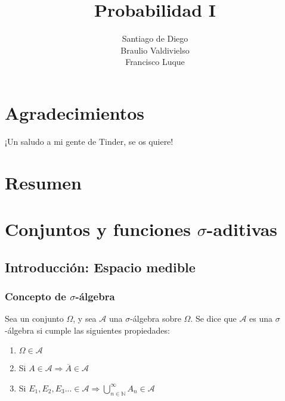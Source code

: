 \documentclass[12pt,a4paper]{book}
\author{Santiago de Diego\\Braulio Valdivielso\\Francisco Luque}
\title{Probabilidad I}
\date{}
\begin{document}
\maketitle
\newtheorem{theorem}{Teorema}[section]
\newtheorem{lemma}{Lema}[section]
\newtheorem{proof}{Demostración}[section]
\newpage
\chapter*{Agradecimientos} %
 
¡Un saludo a mi gente de Tinder, se os quiere!

\chapter*{Resumen} %

\tableofcontents
\chapter{Conjuntos y funciones $\sigma$-aditivas}

\section{Introducción: Espacio medible}

\subsection*{Concepto de $\sigma$-álgebra}
Sea un conjunto $\Omega$, y sea $\mathcal{A}$ una $\sigma$-álgebra sobre $\Omega$. Se dice que $\mathcal{A}$ es una $\sigma$-álgebra si cumple las siguientes propiedades:

\begin{enumerate}
\item $\Omega \in \mathcal{A}$
\item Si $A \in \mathcal{A} \Rightarrow \overline{A} \in \mathcal{A}$
\item Si $E_1, E_2, E_3... \in \mathcal{A} \Rightarrow \displaystyle \bigcup_{n \in \mathbb{N}}^{\infty} A_n \in \mathcal{A}$
\end{enumerate}
\end{document}
